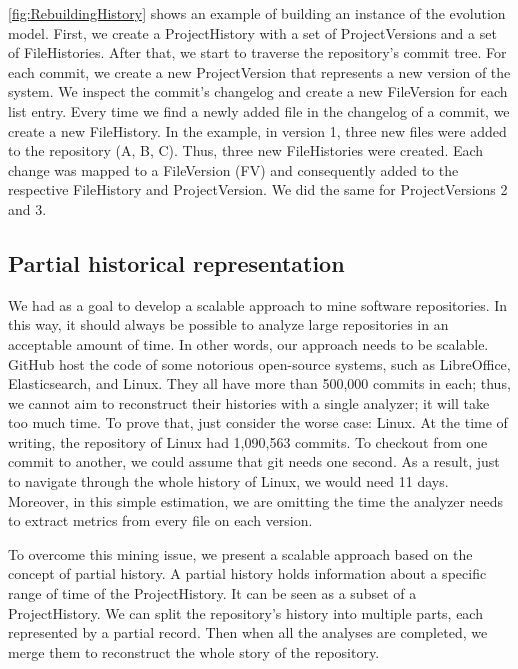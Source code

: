 \autoref{fig:RebuildingHistory} shows an example of building an instance of the evolution model.
First, we create a ProjectHistory with a set of ProjectVersions and a set of FileHistories.
After that, we start to traverse the repository's commit tree.
For each commit, we create a new ProjectVersion that represents a new version of the system. 
We inspect the commit's changelog and create a new FileVersion for each list entry.
Every time we find a newly added file in the changelog of a commit, we create a new FileHistory. 
In the example, in version 1, three new files were added to the repository (A, B, C). Thus, three new FileHistories were created.
Each change was mapped to a FileVersion (FV) and consequently added to the respective FileHistory and ProjectVersion. 
We did the same for ProjectVersions 2 and 3. 

\label{sec:partialHistoricalRepr}
\subsection*{Partial historical representation}
We had as a goal to develop a scalable approach to mine software repositories. In this way, it should always be possible to analyze large repositories in an acceptable amount of time. 
In other words, our approach needs to be scalable.
GitHub host the code of some notorious open-source systems, such as LibreOffice, Elasticsearch, and Linux.
They all have more than 500,000 commits in each; thus, we cannot aim to reconstruct their histories with a single analyzer; it will take too much time.  
To prove that, just consider the worse case: Linux. 
At the time of writing, the repository of Linux had 1,090,563 commits. 
To checkout from one commit to another, we could assume that git needs one second. 
As a result, just to navigate through the whole history of Linux, we would need 11 days.
Moreover, in this simple estimation, we are omitting the time the analyzer needs to extract metrics from every file on each version. 

To overcome this mining issue, we present a scalable approach based on the concept of partial history.
A partial history holds information about a specific range of time of the ProjectHistory. 
It can be seen as a subset of a ProjectHistory. 
We can split the repository's history into multiple parts, each represented by a partial record. Then when all the analyses are completed, we merge them to reconstruct the whole story of the repository.


